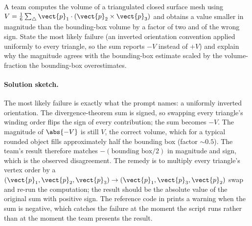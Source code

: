 \begin{exercise}
A team computes the volume of a triangulated closed surface mesh
using $V = \tfrac{1}{6}\sum_{\triangle} \vect{p}_{1} \cdot
(\vect{p}_{2} \times \vect{p}_{3})$ and obtains a value smaller in
magnitude than the bounding-box volume by a factor of two and of
the wrong sign. State the most likely failure (an inverted
orientation convention applied uniformly to every triangle, so the
sum reports $-V$ instead of $+V$) and explain why the magnitude
agrees with the bounding-box estimate scaled by the
volume-fraction the bounding-box overestimates.

\paragraph{Solution sketch.} The most likely failure is exactly what
the prompt names: a uniformly inverted orientation. The
divergence-theorem sum is signed, so swapping every triangle's
winding order flips the sign of every contribution; the sum becomes
$-V$. The magnitude of $\abs{-V}$ is still $V$, the correct volume,
which for a typical rounded object fills approximately half the
bounding box (factor $\sim 0.5$). The team's result therefore
matches $-(\text{bounding box}/2)$ in magnitude and sign, which is
the observed disagreement. The remedy is to multiply every
triangle's vertex order by a $(\vect{p}_{1}, \vect{p}_{2},
\vect{p}_{3}) \to (\vect{p}_{1}, \vect{p}_{3}, \vect{p}_{2})$ swap
and re-run the computation; the result should be the absolute value
of the original sum with positive sign. The reference code in
 prints a warning when the sum is
negative, which catches the failure at the moment the script runs
rather than at the moment the team presents the result.
\end{exercise}

